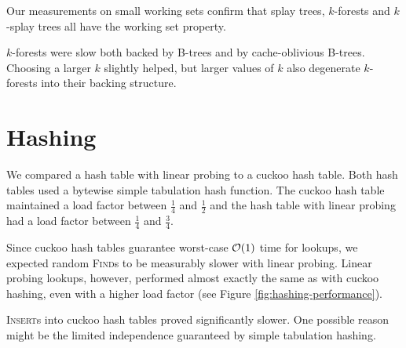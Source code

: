 Our measurements on small working sets confirm that splay trees, $k$-forests
and $k$-splay trees all have the working set property.

$k$-forests were slow both backed by B-trees and by cache-oblivious B-trees.
Choosing a larger $k$ slightly helped, but larger values of $k$ also degenerate
$k$-forests into their backing structure.

\section{Hashing}
We compared a hash table with linear probing to a cuckoo hash table.
Both hash tables used a bytewise simple tabulation hash function.
The cuckoo hash table maintained a load factor between $\frac{1}{4}$ and
$\frac{1}{2}$ and the hash table with linear probing had a load factor
between $\frac{1}{4}$ and $\frac{3}{4}$.

Since cuckoo hash tables guarantee worst-case $\mathcal{O}(1)$ time for lookups,
we expected random \textsc{Find}s to be measurably slower with linear probing.
Linear probing lookups, however, performed almost exactly the same as
with cuckoo hashing, even with a higher load factor (see Figure
\ref{fig:hashing-performance}).

\textsc{Insert}s into cuckoo hash tables proved significantly slower.
One possible reason might be the limited independence guaranteed by simple
tabulation hashing.

